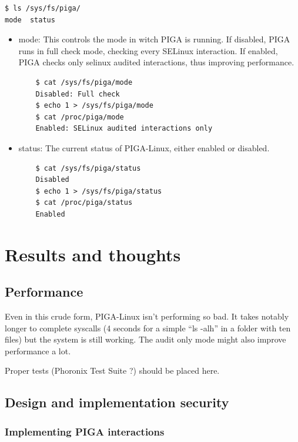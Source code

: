 \documentclass[pdftex,a4paper,titlepage,11pt]{article}
\begin{document}
\begin{lstlisting}
$ ls /sys/fs/piga/
mode  status
\end{lstlisting}

\begin{itemize}
	\item mode: This controls the mode in witch PIGA is running. If disabled,
PIGA runs in full check mode, checking every SELinux interaction. If enabled,
PIGA checks only selinux audited interactions, thus improving performance.
	\begin{lstlisting}
	$ cat /sys/fs/piga/mode
	Disabled: Full check
	$ echo 1 > /sys/fs/piga/mode
	$ cat /proc/piga/mode
	Enabled: SELinux audited interactions only
	\end{lstlisting}
	\item status: The current status of PIGA-Linux, either enabled or disabled.
	\begin{lstlisting}
	$ cat /sys/fs/piga/status
	Disabled
	$ echo 1 > /sys/fs/piga/status
	$ cat /proc/piga/status
	Enabled
	\end{lstlisting}
\end{itemize}

\newpage

\section{Results and thoughts}

\subsection{Performance}

Even in this crude form, PIGA-Linux isn't performing so bad. It takes notably
longer to complete syscalls (4 seconds for a simple ``ls -alh'' in a folder with
ten files) but the system is still working. The audit only mode might also
improve performance a lot.

Proper tests (Phoronix Test Suite ?) should be placed here.

\subsection{Design and implementation security}

\subsubsection{Implementing PIGA interactions}
\end{document}
